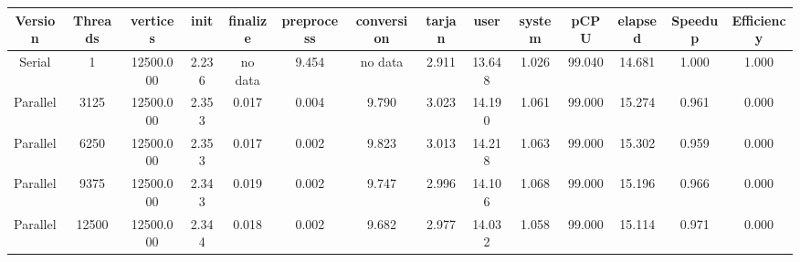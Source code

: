 \begin{tabular}{|c|c|c|c|c|c|c|c|c|c|c|c|c|c|}
\toprule
 Version &  Threads &  vertices &  init & finalize &  preprocess & conversion &  tarjan &   user &  system &   pCPU &  elapsed &  Speedup &  Efficiency \\
\midrule
  Serial &        1 & 12500.000 & 2.236 &  no data &       9.454 &    no data &   2.911 & 13.648 &   1.026 & 99.040 &   14.681 &    1.000 &       1.000 \\
Parallel &     3125 & 12500.000 & 2.353 &    0.017 &       0.004 &      9.790 &   3.023 & 14.190 &   1.061 & 99.000 &   15.274 &    0.961 &       0.000 \\
Parallel &     6250 & 12500.000 & 2.353 &    0.017 &       0.002 &      9.823 &   3.013 & 14.218 &   1.063 & 99.000 &   15.302 &    0.959 &       0.000 \\
Parallel &     9375 & 12500.000 & 2.343 &    0.019 &       0.002 &      9.747 &   2.996 & 14.106 &   1.068 & 99.000 &   15.196 &    0.966 &       0.000 \\
Parallel &    12500 & 12500.000 & 2.344 &    0.018 &       0.002 &      9.682 &   2.977 & 14.032 &   1.058 & 99.000 &   15.114 &    0.971 &       0.000 \\
\bottomrule
\end{tabular}
